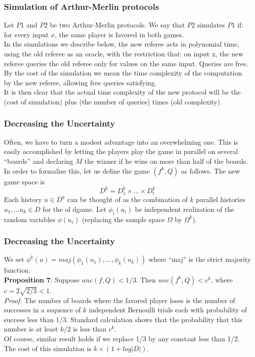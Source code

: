 \documentclass{beamer}
\begin{document}
\begin{frame}
\frametitle{Simulation of Arthur-Merlin protocols}
Let $P1$ and $P2$ be two Arthur-Merlin protocols. We say that $P2$ simulates $P1$ if: for every input $x$, the same player is favored in both games.\\
In the simulations we describe below, the new referee acts in polynomial time, using the old referee as an oracle, with the restriction that: on input x, the new referee queries the old referee only for values on the same input. Queries are free. By the cost of the simulation we mean the time complexity of the computation by the new referee, allowing free queries satisfying.\\
It is then clear that the actual time complexity of the new protocol will be the (cost of simulation) plus (the number of queries) times (old complexity).
\end{frame}

\begin{frame}
\frametitle{Decreasing the Uncertainty}
Often, we have to turn a modest advantage into an overwhelming one. This is easily accomplished by letting the players play the game in parallel on several ``boards'' and declaring $M$ the winner if he wins on more than half of the boards.\\
In order to formalize this, let us define the game $(f^k, Q)$ as follows. The new game space is $$D^k = D_1^k \times \dots \times D_t^k$$
Each history $u \in D^k$ can be thought of as the combination of $k$ parallel histories $u_1, \ldots u_k \in D$ for the ol dgame. Let $\phi_i(u_i)$ be independent realization of the random variables $\phi(u_i)$ (replacing the sample space $\Omega$ by $\Omega^k$). 
\end{frame}

\begin{frame}
\frametitle{Decreasing the Uncertainty}
We set $\phi^k(u) = maj(\phi_1(u_1),\ldots,\phi_k(u_k))$ where ``maj'' is the strict majority function.\\
\textbf{Proposition 7}: Suppose $unc(f, Q) < 1/3$. Then $unc(f^k, Q) < c^k$, where $c=2\sqrt{2/3} < 1$.\\
\textit{Proof.} The number of boards where the favored player loses is the number of successes in a sequence of $k$ independent Bernoulli trials each with probability of success less than 1/3. Standard calculation shows that the probability that this number is at least $k/2$ is less than $c^k$.\\
Of course, similar result holds if we replace 1/3 by any constant less than 1/2. The cost of this simulation is $k \times (1 + log |D|)$.
\end{frame}
\end{document}
